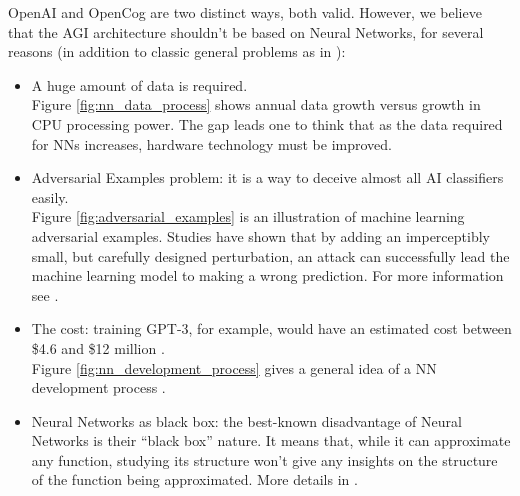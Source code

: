 OpenAI and OpenCog are two distinct ways, both valid. However, we believe that the AGI architecture shouldn't be based on Neural Networks, for several reasons (in addition to classic general problems as in \cite{323037}):

\begin{itemize}
	\item A huge amount of data is required. \\
Figure \ref{fig:nn_data_process} shows annual data growth versus growth in CPU processing power. The gap leads one to think that as the data required for NNs increases, hardware technology must be improved.
	\item Adversarial Examples problem: it is a way to deceive almost all AI classifiers easily. \\
Figure \ref{fig:adversarial_examples} is an illustration of machine learning adversarial examples. Studies have shown that by adding an imperceptibly small, but carefully designed perturbation, an attack can successfully lead the machine learning model to making a wrong prediction. For more information see \cite{42503, DBLP:journals/corr/abs-1905-10615, 7467366, goodfellow_2020}.
	\item The cost: training GPT-3, for example, would have an estimated cost between \$4.6 and \$12 million \cite{dickson_2020, wiggers_2021}. \\
Figure \ref{fig:nn_development_process} gives a general idea of a NN development process .  
	\item Neural Networks as black box: the best-known disadvantage of Neural Networks is their “black box” nature. It means that, while it can approximate any function, studying its structure won't give any insights on the structure of the function being approximated. More details in \cite{DBLP:journals/corr/abs-1911-12116}. 
\end{itemize}

